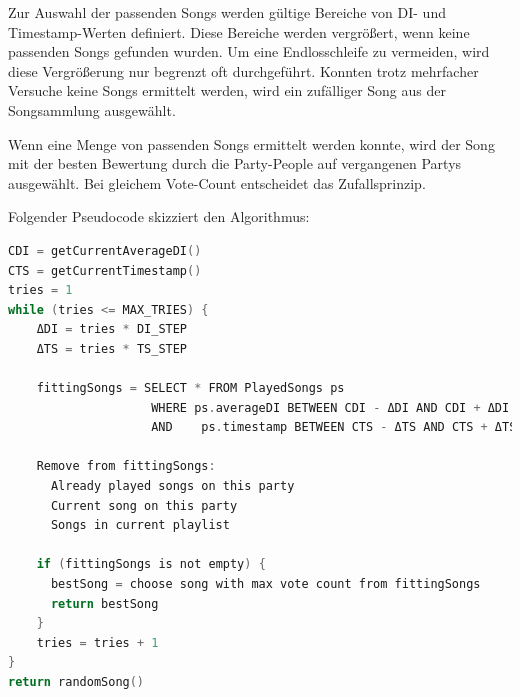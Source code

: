 Zur Auswahl der passenden Songs werden gültige Bereiche von DI- und Timestamp-Werten definiert.
Diese Bereiche werden vergrößert, wenn keine passenden Songs gefunden wurden. Um eine Endlosschleife
zu vermeiden, wird diese Vergrößerung nur begrenzt oft durchgeführt. Konnten trotz mehrfacher 
Versuche keine Songs ermittelt werden, wird ein zufälliger Song aus der Songsammlung ausgewählt.

Wenn eine Menge von passenden Songs ermittelt werden konnte, wird der Song mit der besten
Bewertung durch die Party-People auf vergangenen Partys ausgewählt. Bei gleichem Vote-Count
entscheidet das Zufallsprinzip. 

Folgender Pseudocode skizziert den Algorithmus:
\begin{lstlisting}[language=C]
CDI = getCurrentAverageDI()
CTS = getCurrentTimestamp()
tries = 1
while (tries <= MAX_TRIES) {
	ΔDI = tries * DI_STEP
	ΔTS = tries * TS_STEP
	
	fittingSongs = SELECT * FROM PlayedSongs ps
                    WHERE ps.averageDI BETWEEN CDI - ΔDI AND CDI + ΔDI
                    AND    ps.timestamp BETWEEN CTS - ΔTS AND CTS + ΔTS
				   	 
	Remove from fittingSongs: 
	  Already played songs on this party
	  Current song on this party
	  Songs in current playlist
		
	if (fittingSongs is not empty) {
	  bestSong = choose song with max vote count from fittingSongs
	  return bestSong
	}
	tries = tries + 1
}
return randomSong()
\end{lstlisting}